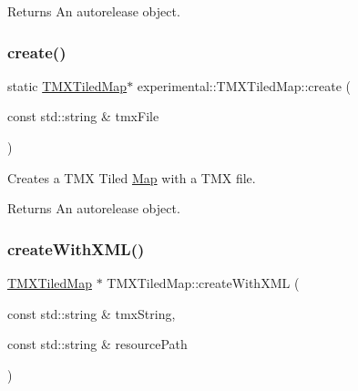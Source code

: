 \begin{DoxyReturn}{Returns}
An autorelease object. 
\end{DoxyReturn}
\mbox{\label{classexperimental_1_1TMXTiledMap_a8abca4e303ab8938e093b24cbf750f2d}} 
\subsubsection{\texorpdfstring{create()}{create()}\hspace{0.1cm}{\footnotesize\ttfamily [2/2]}}
{\footnotesize\ttfamily static \hyperlink{classexperimental_1_1TMXTiledMap}{T\+M\+X\+Tiled\+Map}$\ast$ experimental\+::\+T\+M\+X\+Tiled\+Map\+::create (\begin{DoxyParamCaption}\item[{const std\+::string \&}]{tmx\+File }\end{DoxyParamCaption})\hspace{0.3cm}{\ttfamily [static]}}

Creates a T\+MX Tiled \hyperlink{classMap}{Map} with a T\+MX file.

\begin{DoxyReturn}{Returns}
An autorelease object. 
\end{DoxyReturn}
\mbox{\label{classexperimental_1_1TMXTiledMap_af3a5adeaeec14ab3455494f0c230335b}} 
\subsubsection{\texorpdfstring{create\+With\+X\+M\+L()}{createWithXML()}\hspace{0.1cm}{\footnotesize\ttfamily [1/2]}}
{\footnotesize\ttfamily \hyperlink{classexperimental_1_1TMXTiledMap}{T\+M\+X\+Tiled\+Map} $\ast$ T\+M\+X\+Tiled\+Map\+::create\+With\+X\+ML (\begin{DoxyParamCaption}\item[{const std\+::string \&}]{tmx\+String,  }\item[{const std\+::string \&}]{resource\+Path }\end{DoxyParamCaption})\hspace{0.3cm}{\ttfamily [static]}}

